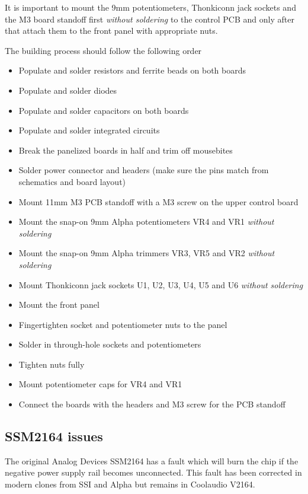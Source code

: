 \documentclass{article}
\begin{document}
It is important to mount the 9mm potentiometers, Thonkiconn jack sockets and the M3 board standoff first \emph{without soldering} to the control PCB and only after that attach them to the front panel with appropriate nuts. \newline


The building process should follow the following order

\begin{itemize}
\item Populate and solder resistors and ferrite beads on both boards
\item Populate and solder diodes
\item Populate and solder capacitors on both boards
\item Populate and solder integrated circuits
\item Break the panelized boards in half and trim off mousebites
\item Solder power connector and headers (make sure the pins match from schematics and board layout)
\item Mount 11mm M3 PCB standoff with a M3 screw on the upper control board
\item Mount the snap-on 9mm Alpha potentiometers VR4 and VR1 \emph{without soldering}
\item Mount the snap-on 9mm Alpha trimmers VR3, VR5 and VR2 \emph{without soldering}
\item Mount Thonkiconn jack sockets U1, U2, U3, U4, U5 and U6 \emph{without soldering}
\item Mount the front panel
\item Fingertighten socket and potentiometer nuts to the panel
\item Solder in through-hole sockets and potentiometers
\item Tighten nuts fully
\item Mount potentiometer caps for VR4 and VR1
\item Connect the boards with the headers and M3 screw for the PCB standoff
\end{itemize}

\subsection{SSM2164 issues}
The original Analog Devices SSM2164 has a fault which will burn the chip if the negative power supply rail becomes unconnected. This fault has been corrected in modern clones from SSI and Alpha but remains in Coolaudio V2164.\newline
\end{document}
